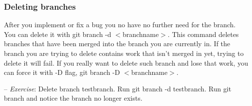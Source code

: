 \documentclass[12pt,a4]{article}
\newcommand{\ilcode}[1]{\textcolor[RGB]{160, 110, 220}{#1}}
\begin{document}
\subsubsection{Deleting branches}
After you implement or fix a bug you no have no further need for the branch. You
can delete it with \ilcode{git branch -d $<$branchname$>$}. This command deletes
branches that have been merged into the branch you are currently in. If the
branch you are trying to delete contains work that isn't merged in yet, trying
to delete it will fail. If you really want to delete such branch and lose that
work, you can force it with \ilcode{-D} flag, \ilcode{git branch -D
$<$branchname$>$}.

{\sf -- \emph{Exercise}:} Delete branch testbranch. Run \ilcode{git branch -d
testbranch}. Run \ilcode{git branch} and notice the branch no longer exists.
\end{document}
